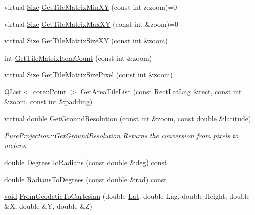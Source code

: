 \begin{DoxyCompactItemize}
\item 
virtual \hyperlink{structcore_1_1_size}{\-Size} \hyperlink{group___o_p_map_widget_ga655cbf971f1a5d2df37f97d6e7b422f5}{\-Get\-Tile\-Matrix\-Min\-X\-Y} (const int \&zoom)=0
\item 
virtual \hyperlink{structcore_1_1_size}{\-Size} \hyperlink{group___o_p_map_widget_ga5588735ea108bf7743f87c86fe14f3f1}{\-Get\-Tile\-Matrix\-Max\-X\-Y} (const int \&zoom)=0
\item 
virtual \-Size \hyperlink{group___o_p_map_widget_ga4ae08027e37b2017b358d8fbe75ae5c6}{\-Get\-Tile\-Matrix\-Size\-X\-Y} (const int \&zoom)
\item 
int \hyperlink{group___o_p_map_widget_ga9729f2fced303b2b353fbb8349a16a18}{\-Get\-Tile\-Matrix\-Item\-Count} (const int \&zoom)
\item 
virtual \-Size \hyperlink{group___o_p_map_widget_ga2756c4a5e52399306da81bb913106474}{\-Get\-Tile\-Matrix\-Size\-Pixel} (const int \&zoom)
\item 
\-Q\-List$<$ \hyperlink{structcore_1_1_point}{core\-::\-Point} $>$ \hyperlink{group___o_p_map_widget_gab8c7480cc18ebba515ca1c9c4258a2fd}{\-Get\-Area\-Tile\-List} (const \hyperlink{structinternals_1_1_rect_lat_lng}{\-Rect\-Lat\-Lng} \&rect, const int \&zoom, const int \&padding)
\item 
virtual double \hyperlink{group___o_p_map_widget_ga40a54138c94f8707cc2e2d9f2c5e1297}{\-Get\-Ground\-Resolution} (const int \&zoom, const double \&latitude)
\begin{DoxyCompactList}\small\item\em \hyperlink{group___o_p_map_widget_ga40a54138c94f8707cc2e2d9f2c5e1297}{\-Pure\-Projection\-::\-Get\-Ground\-Resolution} \-Returns the conversion from pixels to meters. \end{DoxyCompactList}\item 
double \hyperlink{group___o_p_map_widget_gaf5f3d8b3ad4c4fdb6ab6ff4bdb2b2584}{\-Degrees\-To\-Radians} (const double \&deg) const 
\item 
double \hyperlink{group___o_p_map_widget_ga61454b50ff7258a201eb43229885c8f3}{\-Radians\-To\-Degrees} (const double \&rad) const 
\item 
\hyperlink{group___u_a_v_objects_plugin_ga444cf2ff3f0ecbe028adce838d373f5c}{void} \hyperlink{group___o_p_map_widget_gadbd11323a9e1396fefe06cdf8bf4755d}{\-From\-Geodetic\-To\-Cartesian} (double \hyperlink{_o_p_plots_8m_afdc4c4bc9859d268f8b5d1cc44b8ab7c}{\-Lat}, double \-Lng, double \-Height, double \&\-X, double \&\-Y, double \&\-Z)
\item 

\end{DoxyCompactItemize}
